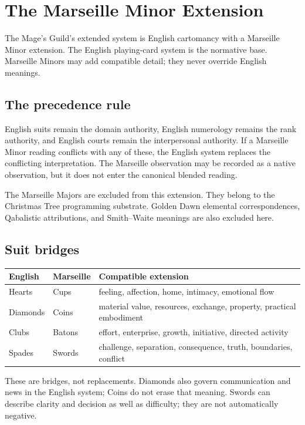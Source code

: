 \chapter{The Marseille Minor Extension}

The Mage's Guild's extended system is English cartomancy with a Marseille Minor
extension. The English playing-card system is the normative base. Marseille
Minors may add compatible detail; they never override English meanings.

\section{The precedence rule}

English suits remain the domain authority, English numerology remains the rank
authority, and English courts remain the interpersonal authority. If a Marseille
Minor reading conflicts with any of these, the English system replaces the
conflicting interpretation. The Marseille observation may be recorded as a
native observation, but it does not enter the canonical blended reading.

The Marseille Majors are excluded from this extension. They belong to the
Christmas Tree programming substrate. Golden Dawn elemental correspondences,
Qabalistic attributions, and Smith--Waite meanings are also excluded here.

\section{Suit bridges}

\begin{longtable}{p{}p{}p{}}
\toprule
English & Marseille & Compatible extension \\
\midrule
Hearts & Cups & feeling, affection, home, intimacy, emotional flow \\
Diamonds & Coins & material value, resources, exchange, property, practical embodiment \\
Clubs & Batons & effort, enterprise, growth, initiative, directed activity \\
Spades & Swords & challenge, separation, consequence, truth, boundaries, conflict \\
\bottomrule
\end{longtable}

These are bridges, not replacements. Diamonds also govern communication and
news in the English system; Coins do not erase that meaning. Swords can describe
clarity and decision as well as difficulty; they are not automatically negative.

